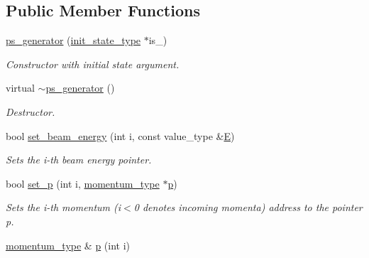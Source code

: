\subsection*{Public Member Functions}
\begin{DoxyCompactItemize}
\item 
\hypertarget{a00441_a3c0bcf4553cb153ca1cec8dbc5aeb6ff}{\hyperlink{a00441_a3c0bcf4553cb153ca1cec8dbc5aeb6ff}{ps\-\_\-generator} (\hyperlink{a00304}{init\-\_\-state\-\_\-type} $\ast$is\-\_\-)}\label{a00441_a3c0bcf4553cb153ca1cec8dbc5aeb6ff}

\begin{DoxyCompactList}\small\item\em Constructor with initial state argument. \end{DoxyCompactList}\item 
\hypertarget{a00441_a36a9c90b1214d428727ce0970807b8c1}{virtual \hyperlink{a00441_a36a9c90b1214d428727ce0970807b8c1}{$\sim$ps\-\_\-generator} ()}\label{a00441_a36a9c90b1214d428727ce0970807b8c1}

\begin{DoxyCompactList}\small\item\em Destructor. \end{DoxyCompactList}\item 
\hypertarget{a00441_a0103bf74f672c6c088dfdc443c62d6b7}{bool \hyperlink{a00441_a0103bf74f672c6c088dfdc443c62d6b7}{set\-\_\-beam\-\_\-energy} (int i, const value\-\_\-type \&\hyperlink{a00442_a8a2e0cd9b961dcfa2eb1ac7426cf3f5f}{E})}\label{a00441_a0103bf74f672c6c088dfdc443c62d6b7}

\begin{DoxyCompactList}\small\item\em Sets the i-\/th beam energy pointer. \end{DoxyCompactList}\item 
bool \hyperlink{a00441_a5e4122d58de28c646e6d1c469ada86e7}{set\-\_\-p} (int i, \hyperlink{a00559}{momentum\-\_\-type} $\ast$\hyperlink{a00441_ac25aaa44a2bde95d582aac52f85fdfdf}{p})
\begin{DoxyCompactList}\small\item\em Sets the i-\/th momentum (i$<$0 denotes incoming momenta) address to the pointer p. \end{DoxyCompactList}\item 
\hypertarget{a00441_ac25aaa44a2bde95d582aac52f85fdfdf}{\hyperlink{a00559}{momentum\-\_\-type} \& \hyperlink{a00441_ac25aaa44a2bde95d582aac52f85fdfdf}{p} (int i)}\label{a00441_ac25aaa44a2bde95d582aac52f85fdfdf}


\end{DoxyCompactItemize}
